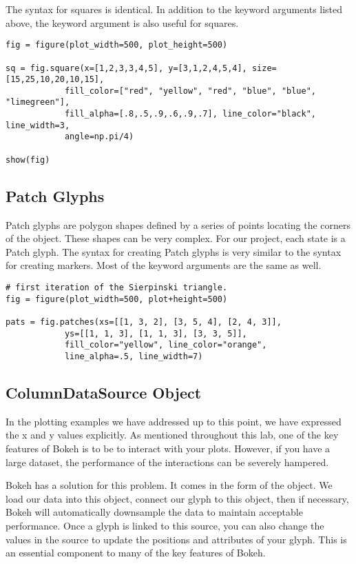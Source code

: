 The syntax for squares is identical. In addition to the keyword arguments listed
above, the  keyword argument is also useful for squares.

\begin{lstlisting}
fig = figure(plot_width=500, plot_height=500)

sq = fig.square(x=[1,2,3,3,4,5], y=[3,1,2,4,5,4], size=[15,25,10,20,10,15],
            fill_color=["red", "yellow", "red", "blue", "blue", "limegreen"],
            fill_alpha=[.8,.5,.9,.6,.9,.7], line_color="black", line_width=3,
            angle=np.pi/4)

show(fig)
\end{lstlisting}

\subsection*{Patch Glyphs}
Patch glyphs are polygon shapes defined by a series of points locating the
corners of the object. These shapes can be very complex. For our project, each
state is a Patch glyph. The syntax for creating Patch glyphs is very similar to
the syntax for creating markers. Most of the keyword arguments are the same as
well.

\begin{lstlisting}
# first iteration of the Sierpinski triangle.
fig = figure(plot_width=500, plot+height=500)

pats = fig.patches(xs=[[1, 3, 2], [3, 5, 4], [2, 4, 3]],
            ys=[[1, 1, 3], [1, 1, 3], [3, 3, 5]],
            fill_color="yellow", line_color="orange",
            line_alpha=.5, line_width=7)
\end{lstlisting}

\subsection*{ColumnDataSource Object}
In the plotting examples we have addressed up to this point, we have expressed
the x and y values explicitly. As mentioned throughout this lab, one of the key
features of Bokeh is to be to interact with your plots. However, if you have
a large dataset, the performance of the interactions can be severely hampered.

Bokeh has a solution for this problem. It comes in the form of the
 object. We load our data into this object, connect our
glyph to this object, then if necessary, Bokeh will automatically downsample the
data to maintain acceptable performance. Once a glyph is linked to this source,
you can also change the values in the source to update the positions and attributes
of your glyph. This is an essential component to many of the key features of
Bokeh.

